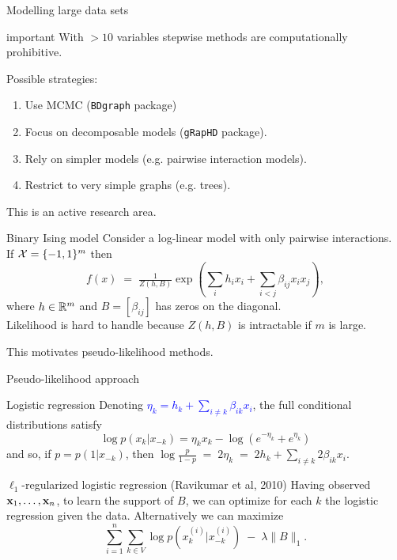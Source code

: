 \documentclass[11pt,handout,aspectratio=169,dvipsnames]{beamer}
\begin{document}
\begin{frame}{Modelling large data sets}
		\begin{beamercolorbox}[wd=\paperwidth,sep=3pt]{important}
With $>10$ variables stepwise methods are computationally prohibitive. 
	\end{beamercolorbox}
	\bigskip
	
Possible strategies:\\[.3cm]
\begin{enumerate}
	\item Use MCMC (\texttt{BDgraph} package)
	\item Focus on \alert{decomposable models} (\texttt{gRapHD} package).\\[.3cm]
	\item Rely on simpler models (e.g. pairwise interaction models). \\[.3cm]
	\item Restrict to very simple graphs (e.g. trees).
\end{enumerate}
\bigskip

\alert{This is an active research area.}
\end{frame}



\begin{frame}{Binary Ising model}
	Consider a log-linear model with only pairwise interactions.\\[.3cm]
	If ${\cal X}=\{-1,1\}^m$ then $$f(x)\;=\;\tfrac{1}{Z(h,B)}\exp\left(\sum_i h_i x_i+\sum_{i<j}\beta_{ij}x_i x_j \right),$$
	where $h\in \mathbb R^m$ and $B=[\beta_{ij}]$ has zeros on the diagonal.\\[.3cm]
	Likelihood is hard to handle because $Z(h,B)$ is intractable if $m$ is large.\\
	\bigskip
	
	This motivates pseudo-likelihood methods.
\end{frame}


\begin{frame}{Pseudo-likelihood approach}
\begin{block}{Logistic regression}
Denoting \textcolor{blue}{$\eta_k=h_k+\sum_{i\neq k}\beta_{ik}x_i$}, the full conditional distributions satisfy
	$$
	\log p(x_k|x_{-k})=\eta_k x_k-\log(e^{-\eta_k}+e^{\eta_k })
	$$ 
	and so, if $p= p(1|x_{-k})$, then \;\;\;\;\;
	$
	\log \frac{p}{1-p}\;=\;2\eta_k\;=\;2h_k+\sum_{i\neq k}2\beta_{ik}x_i.
	$
\end{block}
\begin{alertblock}{$\ell_1$-regularized logistic regression (Ravikumar et al, 2010)}
	Having observed $\mathbf{x}_1,\ldots,\mathbf{x}_n$, to learn the support of $B$, we can optimize for each $k$ the logistic regression given the data. Alternatively we can maximize
	$$
	\sum_{i=1}^n \sum_{k\in V} \log p(x_k^{(i)}|x_{-k}^{(i)})\;-\;\lambda \|B\|_1.
	$$
\end{alertblock}
\end{frame}
\end{document}
